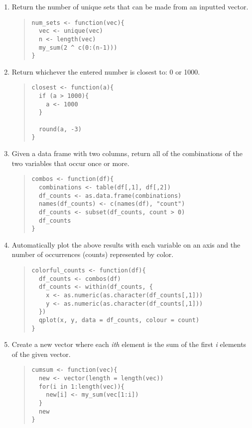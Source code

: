 \documentclass{article}
\begin{document}
\begin{enumerate}
\item Return the number of unique sets that can be made from an inputted vector.
  \begin{quote}
    \begin{verbatim}
num_sets <- function(vec){
  vec <- unique(vec)
  n <- length(vec)
  my_sum(2 ^ c(0:(n-1)))
}
    \end{verbatim}
  \end{quote}

\item Return whichever the entered number is closest to: 0 or 1000.
  \begin{quote}
    \begin{verbatim}
closest <- function(a){
  if (a > 1000){
  	a <- 1000
  }
  
  round(a, -3)
}
    \end{verbatim}
  \end{quote}

\item Given a data frame with two columns, return all of the combinations of the two variables that occur once or more.
  \begin{quote}
    \begin{verbatim}
combos <- function(df){
  combinations <- table(df[,1], df[,2])
  df_counts <- as.data.frame(combinations)
  names(df_counts) <- c(names(df), "count")
  df_counts <- subset(df_counts, count > 0)
  df_counts
}    
    \end{verbatim}
  \end{quote}

\item Automatically plot the above results with each variable on an axis and the number of occurrences (counts) represented by color.
  \begin{quote}
    \begin{verbatim}
colorful_counts <- function(df){
  df_counts <- combos(df)
  df_counts <- within(df_counts, {
    x <- as.numeric(as.character(df_counts[,1]))
    y <- as.numeric(as.character(df_counts[,1]))
  })
  qplot(x, y, data = df_counts, colour = count)
}     
    \end{verbatim}
  \end{quote}

\item Create a new vector where each \emph{ith} element is the sum of the first \emph{i} elements of the given vector.
  \begin{quote}
    \begin{verbatim}
cumsum <- function(vec){
  new <- vector(length = length(vec))
  for(i in 1:length(vec)){
  	new[i] <- my_sum(vec[1:i])
  }
  new
}
    \end{verbatim}
  \end{quote}



\end{enumerate}
\end{document}
